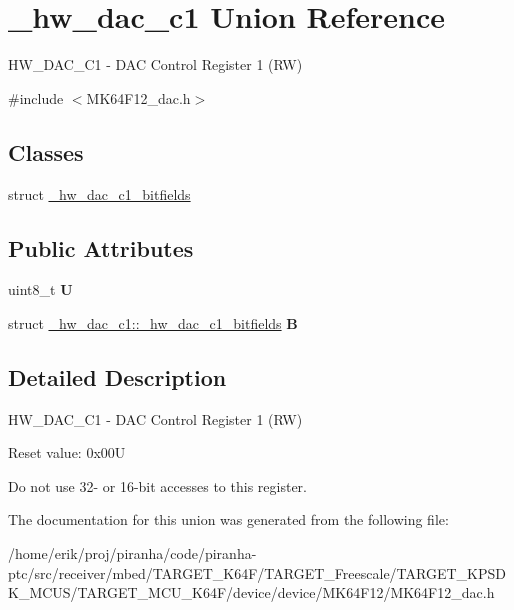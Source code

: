 \hypertarget{union__hw__dac__c1}{}\section{\+\_\+hw\+\_\+dac\+\_\+c1 Union Reference}
\label{union__hw__dac__c1}


H\+W\+\_\+\+D\+A\+C\+\_\+\+C1 -\/ D\+AC Control Register 1 (RW)  




{\ttfamily \#include $<$M\+K64\+F12\+\_\+dac.\+h$>$}

\subsection*{Classes}
\begin{DoxyCompactItemize}
\item 
struct \hyperlink{struct__hw__dac__c1_1_1__hw__dac__c1__bitfields}{\+\_\+hw\+\_\+dac\+\_\+c1\+\_\+bitfields}
\end{DoxyCompactItemize}
\subsection*{Public Attributes}
\begin{DoxyCompactItemize}
\item 
uint8\+\_\+t {\bfseries U}\hypertarget{union__hw__dac__c1_acb7c24af39118e3af0d876050c188691}{}\label{union__hw__dac__c1_acb7c24af39118e3af0d876050c188691}

\item 
struct \hyperlink{struct__hw__dac__c1_1_1__hw__dac__c1__bitfields}{\+\_\+hw\+\_\+dac\+\_\+c1\+::\+\_\+hw\+\_\+dac\+\_\+c1\+\_\+bitfields} {\bfseries B}\hypertarget{union__hw__dac__c1_a5a154e3f83219d3d481cb17642824435}{}\label{union__hw__dac__c1_a5a154e3f83219d3d481cb17642824435}

\end{DoxyCompactItemize}


\subsection{Detailed Description}
H\+W\+\_\+\+D\+A\+C\+\_\+\+C1 -\/ D\+AC Control Register 1 (RW) 

Reset value\+: 0x00U

Do not use 32-\/ or 16-\/bit accesses to this register. 

The documentation for this union was generated from the following file\+:\begin{DoxyCompactItemize}
\item 
/home/erik/proj/piranha/code/piranha-\/ptc/src/receiver/mbed/\+T\+A\+R\+G\+E\+T\+\_\+\+K64\+F/\+T\+A\+R\+G\+E\+T\+\_\+\+Freescale/\+T\+A\+R\+G\+E\+T\+\_\+\+K\+P\+S\+D\+K\+\_\+\+M\+C\+U\+S/\+T\+A\+R\+G\+E\+T\+\_\+\+M\+C\+U\+\_\+\+K64\+F/device/device/\+M\+K64\+F12/M\+K64\+F12\+\_\+dac.\+h\end{DoxyCompactItemize}
